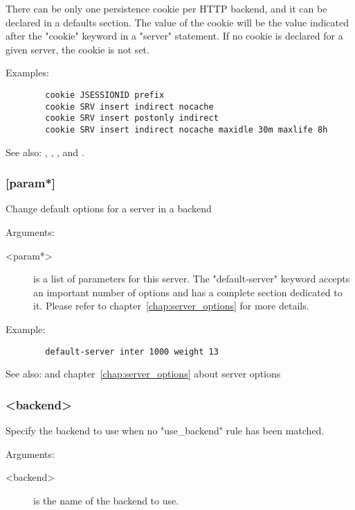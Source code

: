   There can be only one persistence cookie per HTTP backend, and it can be
  declared in a defaults section. The value of the cookie will be the value
  indicated after the "cookie" keyword in a "server" statement. If no cookie
  is declared for a given server, the cookie is not set.

  Examples:
  \begin{verbatim}
        cookie JSESSIONID prefix
        cookie SRV insert indirect nocache
        cookie SRV insert postonly indirect
        cookie SRV insert indirect nocache maxidle 30m maxlife 8h
  \end{verbatim}


See also: , , , 
             and .

\subsubsection[default-server]{ [param*]}
  Change default options for a server in a backend
  
  
  Arguments:
  \begin{description}
  \item[<param*>]  is a list of parameters for this server. The "default-server"
              keyword accepts an important number of options and has a complete
              section dedicated to it. Please refer to chapter~\ref{chap:server_options} for more
              details.
  \end{description}

  Example:
  \begin{verbatim}
        default-server inter 1000 weight 13
  \end{verbatim}


See also:  and chapter~\ref{chap:server_options} about server options

\subsubsection[default\_backend]{ <backend>}

  Specify the backend to use when no "use\_backend" rule has been matched.
  
  
  Arguments:
  \begin{description}
  \item[<backend>] is the name of the backend to use.
  \end{description}


